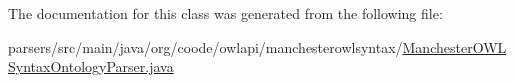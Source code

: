 The documentation for this class was generated from the following file\-:\begin{DoxyCompactItemize}
\item 
parsers/src/main/java/org/coode/owlapi/manchesterowlsyntax/\hyperlink{_manchester_o_w_l_syntax_ontology_parser_8java}{Manchester\-O\-W\-L\-Syntax\-Ontology\-Parser.\-java}\end{DoxyCompactItemize}
